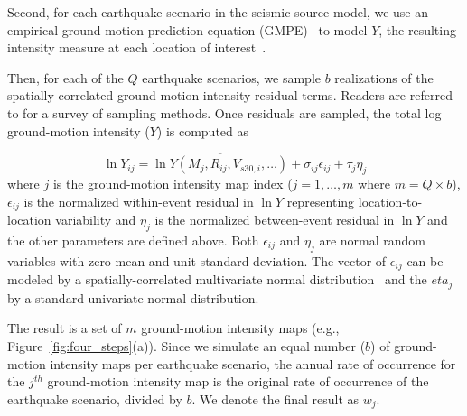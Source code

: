 Second, for each earthquake scenario in the seismic source model, we use an empirical ground-motion prediction equation (GMPE)~\cite[e.g.,][]{boore_ground-motion_2008,abrahamson_summary_2008,chiou_nga_2008,campbell_nga_2008} to model $Y$, the resulting intensity measure at each location of interest~\cite[e.g.,][]{campbell_strong_1985,baker_which_2006,foulser-piggott_predictive_2012}. %

Then, for each of the $Q$ earthquake scenarios, we sample $b$ realizations of the spatially-correlated ground-motion intensity residual terms. Readers are referred to \cite{han_probabilistic_2012} for a survey of sampling methods.  Once residuals are sampled, the total log ground-motion intensity ($Y$) is computed as 

\begin{equation}
\ln Y_{ij} = \overline{\ln Y (M_j, R_{ij}, V_{s30,i}, \ldots) }+ \sigma_{ij} \epsilon_{ij} + \tau_j \eta_j
\label{eq:GMPEmet}
\end{equation}
where $j$ is the ground-motion intensity map index ($j = 1, \ldots, m$ where $m = Q \times b$), $\epsilon_{ij}$ is the normalized within-event residual in $\ln Y$ representing location-to-location variability and $\eta_j$ is the normalized between-event residual in $\ln Y$ and the other parameters are defined above. Both $\epsilon_{ij}$ and $\eta_j$ are normal random variables with zero mean and unit standard deviation. The vector of $\epsilon_{ij}$ can be modeled by a spatially-correlated multivariate normal distribution~\cite[e.g.,][]{jayaram_correlation_2009} %
and the $eta_j$ by a standard univariate normal distribution. 

The result is a set of $m$ ground-motion intensity maps (e.g., Figure~\ref{fig:four_steps}{(a)}). Since we simulate an equal number ($b$) of ground-motion intensity maps per earthquake scenario, the annual rate of occurrence for the $j^{th}$ ground-motion intensity map is the original rate of occurrence of the earthquake scenario, divided by $b$. We denote the final result as $w_j$.  

